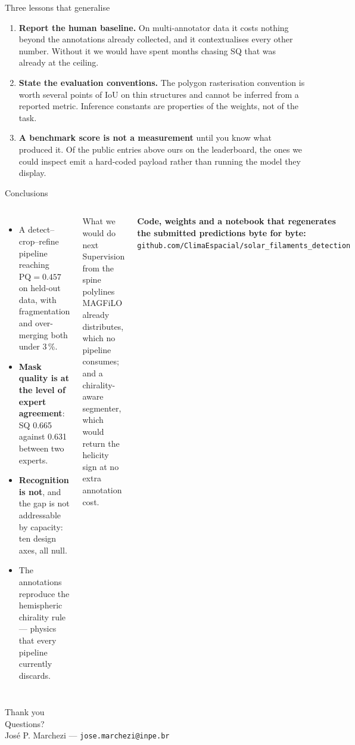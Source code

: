 \documentclass[aspectratio=169,xcolor=dvipsnames]{beamer}
\begin{document}
\begin{frame}{Three lessons that generalise}
  \begin{enumerate}
    \item \textbf{Report the human baseline.} On multi-annotator data it costs nothing beyond the annotations already collected, and it contextualises every other number. Without it we would have spent months chasing SQ that was already at the ceiling.
    \vspace{0.25cm}
    \item \textbf{State the evaluation conventions.} The polygon rasterisation convention is worth several points of IoU on thin structures and cannot be inferred from a reported metric. Inference constants are properties of the weights, not of the task.
    \vspace{0.25cm}
    \item \textbf{A benchmark score is not a measurement} until you know what produced it. Of the public entries above ours on the leaderboard, the ones we could inspect emit a hard-coded payload rather than running the model they display.
  \end{enumerate}
\end{frame}

\begin{frame}{Conclusions}
  \begin{columns}
      \begin{itemize}
        \item A detect--crop--refine pipeline reaching $\mathrm{PQ}=0.457$ on held-out data, with fragmentation and over-merging both under 3\,\%.
        \item \textbf{Mask quality is at the level of expert agreement}: SQ 0.665 against 0.631 between two experts.
        \item \textbf{Recognition is not}, and the gap is not addressable by capacity: ten design axes, all null.
        \item The annotations reproduce the hemispheric chirality rule --- physics that every pipeline currently discards.
      \end{itemize}
      \begin{block}{What we would do next}
        \small
        Supervision from the spine polylines MAGFiLO already distributes, which no pipeline consumes; and a chirality-aware segmenter, which would return the helicity sign at no extra annotation cost.
      \end{block}
      \vspace{0.3cm}
      \small
      \textbf{Code, weights and a notebook that regenerates the submitted predictions byte for byte:}\\
      {\scriptsize\texttt{github.com/ClimaEspacial/solar\_filaments\_detection}}
  \end{columns}
\end{frame}

\begin{frame}[plain]
  \begin{center}
    {\Huge Thank you}\\[0.6cm]
    {\large Questions?}\\[1cm]
    {\small José P. Marchezi --- \texttt{jose.marchezi@inpe.br}}
  \end{center}
\end{frame}
\end{document}
